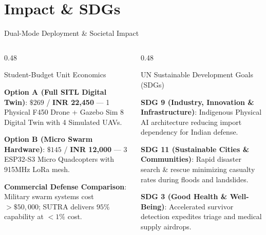 \documentclass[aspectratio=169, 10pt]{beamer}
\begin{document}
\section{Impact \& SDGs}
\begin{frame}{Dual-Mode Deployment \& Societal Impact}
  \begin{columns}[T]
    \begin{column}{0.48\textwidth}
      \begin{defensecard}{Student-Budget Unit Economics}
        \begin{itemize}\setlength{\itemsep}{3pt}
          {\tiny
            \item \textbf{Option A (Full SITL Digital Twin)}: $\$269$ / \textbf{INR 22,450} --- 1 Physical F450 Drone + Gazebo Sim 8 Digital Twin with 4 Simulated UAVs.
            \item \textbf{Option B (Micro Swarm Hardware)}: $\$145$ / \textbf{INR 12,000} --- 3 ESP32-S3 Micro Quadcopters with 915MHz LoRa mesh.

            \item \textbf{Commercial Defense Comparison}: Military swarm systems cost $> \$50,000$; SUTRA delivers $95\%$ capability at $< 1\%$ cost.
          }
        \end{itemize}
      \end{defensecard}
    \end{column}

    \begin{column}{0.48\textwidth}
      \begin{highlightcard}{UN Sustainable Development Goals (SDGs)}
        \begin{itemize}\setlength{\itemsep}{3pt}
          {\tiny
            \item \textbf{SDG 9 (Industry, Innovation \& Infrastructure)}: Indigenous Physical AI architecture reducing import dependency for Indian defense.
            \item \textbf{SDG 11 (Sustainable Cities \& Communities)}: Rapid disaster search \& rescue minimizing casualty rates during floods and landslides.
            \item \textbf{SDG 3 (Good Health \& Well-Being)}: Accelerated survivor detection expedites triage and medical supply airdrops.
          }
        \end{itemize}
      \end{highlightcard}
    \end{column}
  \end{columns}
\end{frame}
\end{document}
